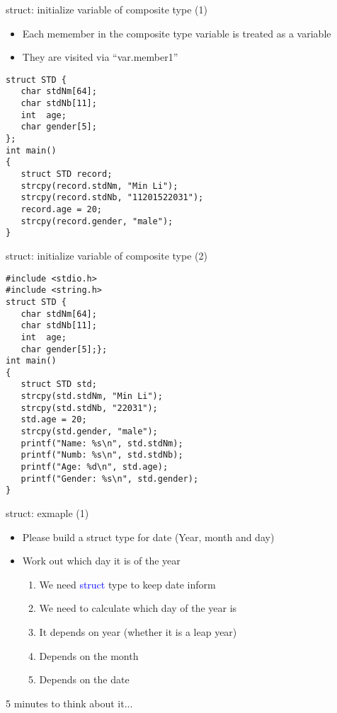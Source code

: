 \begin{frame}[fragile]{struct: initialize variable of composite type (1)}
\begin{itemize}
	\item {Each memember in the composite type variable is treated as a variable}
	\item {They are visited via ``var.member1''}
\end{itemize}
\begin{lstlisting}[linewidth=0.7\linewidth, xleftmargin=0.05\linewidth]
struct STD {
   char stdNm[64];
   char stdNb[11];
   int  age;
   char gender[5];
};
int main()
{
   struct STD record;
   strcpy(record.stdNm, "Min Li");
   strcpy(record.stdNb, "11201522031");
   record.age = 20;
   strcpy(record.gender, "male");
}
\end{lstlisting}
\end{frame}

\begin{frame}[fragile]{struct: initialize variable of composite type (2)}
\vspace{-0.15in}
\begin{lstlisting}
#include <stdio.h>
#include <string.h>
struct STD {
   char stdNm[64];
   char stdNb[11];
   int  age;
   char gender[5];};
int main()
{
   struct STD std;
   strcpy(std.stdNm, "Min Li");
   strcpy(std.stdNb, "22031");
   std.age = 20;
   strcpy(std.gender, "male");
   printf("Name: %s\n", std.stdNm);
   printf("Numb: %s\n", std.stdNb);
   printf("Age: %d\n", std.age);
   printf("Gender: %s\n", std.gender);
}
\end{lstlisting}
\end{frame}

\begin{frame}[fragile]{struct: exmaple (1)}
\begin{itemize}
	\item {Please build a struct type for date (Year, month and day)}
	\item {Work out which day it is of the year}
	\begin{enumerate}
		\item {We need \textcolor{blue}{struct} type to keep date inform}
		\item {We need to calculate which day of the year is}
		\item {It depends on year (whether it is a leap year)}
		\item {Depends on the month}
		\item {Depends on the date}
	\end{enumerate}
\end{itemize}
\begin{center}
	\Large{
	   5 minutes to think about it...
	}
\end{center}
\end{frame}

